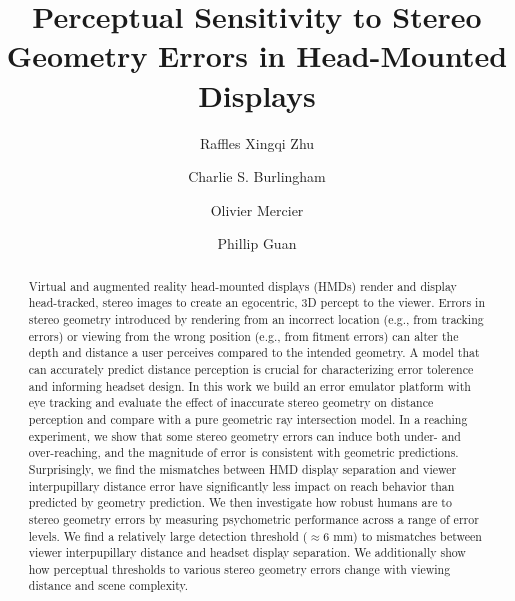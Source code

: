 \documentclass[acmtog, nonacm]{acmart}
\renewcommand\footnotetextcopyrightpermission[1]{}%
\begin{document}
    \title{Perceptual Sensitivity to Stereo Geometry Errors in Head-Mounted Displays}
	\author{Raffles Xingqi Zhu}

	\author{Charlie S. Burlingham}
   
	\author{Olivier Mercier}

	\author{Phillip Guan}
	
	\begin{abstract}
        Virtual and augmented reality head-mounted displays (HMDs) render and display head-tracked, stereo images to create an egocentric, 3D percept to the viewer. Errors in stereo geometry introduced by rendering from an incorrect location (e.g., from tracking errors) or viewing from the wrong position (e.g., from fitment errors) can alter the depth and distance a user perceives compared to the intended geometry. A model that can accurately predict distance perception is crucial for characterizing error tolerence and informing headset design. In this work we build an error emulator platform with eye tracking and evaluate the effect of inaccurate stereo geometry on distance perception and compare with a pure geometric ray intersection model. In a reaching experiment, we show that some stereo geometry errors can induce both under- and over-reaching, and the magnitude of error is consistent with geometric predictions. Surprisingly, we find the mismatches between HMD display separation and viewer interpupillary distance error have significantly less impact on reach behavior than predicted by geometry prediction. We then investigate how robust humans are to stereo geometry errors by measuring psychometric performance across a range of error levels. We find a relatively large detection threshold ($\approx$6 mm) to mismatches between viewer interpupillary distance and headset display separation. We additionally show how perceptual thresholds to various stereo geometry errors change with viewing distance and scene complexity.
	\end{abstract}
        \renewcommand\footnotetextcopyrightpermission[1]{}%
 
\end{document}
